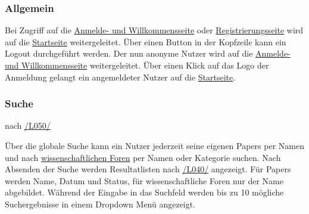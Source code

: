 \subsubsection{Allgemein}
\begin{description}
     Bei Zugriff auf die \hyperref[an:log]{Anmelde- und Willkommensseite} oder \hyperref[an:reg]{Registrierungsseite}
    wird auf die \hyperref[nut:start]{Startseite} weitergeleitet.
     Über einen Button in der Kopfzeile kann ein Logout durchgeführt werden.
    Der nun anonyme Nutzer wird auf die \hyperref[an:log]{Anmelde- und Willkommensseite} weitergeleitet.
     Über einen Klick auf das Logo der Anmeldung gelangt ein angemeldeter Nutzer auf die
    \hyperref[nut:start]{Startseite}.
\end{description}

\subsubsection{Suche} nach \hyperref[leist:050]{/L050/}
\begin{description}
     Über die globale Suche kann ein Nutzer jederzeit seine eigenen Papers per Namen und nach
    \hyperref[glo:wissForum]{wissenschaftlichen Foren} per Namen oder Kategorie
    suchen. Nach Absenden der Suche werden Resultatlisten nach \hyperref[leist:40]{/L040/} angezeigt.
    Für Papers werden Name, Datum und Status, für wissenschaftliche Foren nur der Name abgebildet.
     Während der Eingabe in das Suchfeld werden bis zu 10 mögliche Suchergebnisse in
    einem Dropdown Menü angezeigt.
\end{description}

